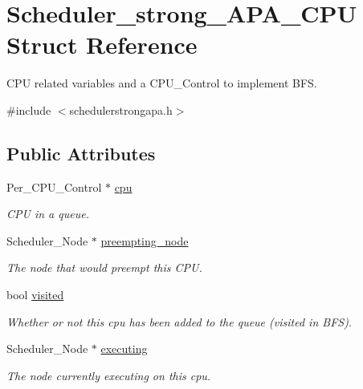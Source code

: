 \hypertarget{structScheduler__strong__APA__CPU}{}\section{Scheduler\+\_\+strong\+\_\+\+A\+P\+A\+\_\+\+C\+PU Struct Reference}
\label{structScheduler__strong__APA__CPU}


C\+PU related variables and a C\+P\+U\+\_\+\+Control to implement B\+FS.  




{\ttfamily \#include $<$schedulerstrongapa.\+h$>$}

\subsection*{Public Attributes}
\begin{DoxyCompactItemize}
\item 
Per\+\_\+\+C\+P\+U\+\_\+\+Control $\ast$ \hyperlink{structScheduler__strong__APA__CPU_ad8faf7fed335de658d1e37061c4cabe1}{cpu}
\begin{DoxyCompactList}\small\item\em C\+PU in a queue. \end{DoxyCompactList}\item 
Scheduler\+\_\+\+Node $\ast$ \hyperlink{structScheduler__strong__APA__CPU_a0fbe6687ca055b673515e2e3b1f023ac}{preempting\+\_\+node}
\begin{DoxyCompactList}\small\item\em The node that would preempt this C\+PU. \end{DoxyCompactList}\item 
bool \hyperlink{structScheduler__strong__APA__CPU_a02c57f2d305f2b6e2a63a38842bb0b6c}{visited}
\begin{DoxyCompactList}\small\item\em Whether or not this cpu has been added to the queue (visited in B\+FS). \end{DoxyCompactList}\item 
Scheduler\+\_\+\+Node $\ast$ \hyperlink{structScheduler__strong__APA__CPU_aecd8c97ce737bc7ad42bd8b77e84ad8b}{executing}
\begin{DoxyCompactList}\small\item\em The node currently executing on this cpu. \end{DoxyCompactList}\end{DoxyCompactItemize}



